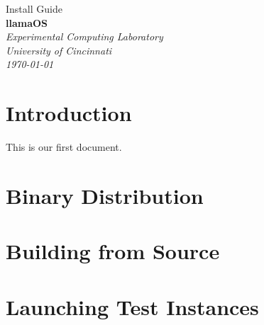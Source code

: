 \documentclass[draft]{article}
\begin{document}

\begin{titlepage}
\raggedleft
{\huge{Install Guide}\\[1.0in]}
{\Huge{\textbf{llamaOS}}\\[0.125in]}
{\Large{}}
\vfill
\itshape
Experimental Computing Laboratory\\
University of Cincinnati\\[0.125in]
\today
\end{titlepage}


\tableofcontents
\clearpage


\section{Introduction}
This is our first document.

\section{Binary Distribution}

\section{Building from Source}

\section{Launching Test Instances}
\end{document}
